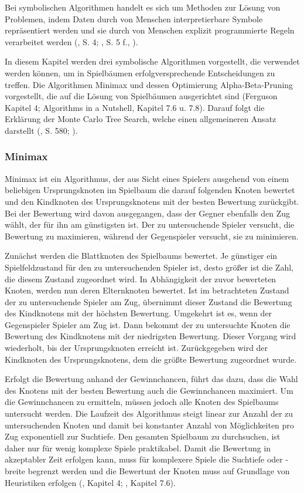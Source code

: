 \label{symbolische-algorithmen}

Bei symbolischen Algorithmen handelt es sich um Methoden zur Lösung von Problemen, indem Daten durch von Menschen interpretierbare Symbole repräsentiert werden und sie durch von Menschen explizit programmierte Regeln verarbeitet werden (\cite{Fergus.2022}, S. 4; \cite{Früh.2022}, S. 5 f., \cite{Garnelo.2019}).

In diesem Kapitel werden drei symbolische Algorithmen vorgestellt, die verwendet werden können, um in Spielbäumen erfolgversprechende Entscheidungen zu treffen. Die Algorithmen Minimax und dessen Optimierung Alpha-Beta-Pruning vorgestellt, die auf die Lösung von Spielbäumen ausgerichtet sind (Ferguson Kapitel 4; Algorithms in a Nutshell, Kapitel 7.6 u. 7.8). Darauf folgt die Erklärung der Monte Carlo Tree Search, welche einen allgemeineren Ansatz darstellt (\cite{Russell.2020}, S. 580; \cite{Swiechowski.2021}).

\subsubsection{Minimax}

Minimax ist ein Algorithmus, der aus Sicht eines Spielers ausgehend von einem beliebigen Ursprungsknoten im Spielbaum die darauf folgenden Knoten bewertet und den Kindknoten des Ursprungsknotens mit der besten Bewertung zurückgibt. Bei der Bewertung wird davon ausgegangen, dass der Gegner ebenfalls den Zug wählt, der für ihn am günstigsten ist. Der zu untersuchende Spieler versucht, die Bewertung zu maximieren, während der Gegenspieler versucht, sie zu minimieren.

Zunächst werden die Blattknoten des Spielbaums bewertet. Je günstiger ein Spielfeldzustand für den zu untersuchenden Spieler ist, desto größer ist die Zahl, die diesem Zustand zugeordnet wird. In Abhängigkeit der zuvor bewerteten Knoten, werden nun deren Elternknoten bewertet. Ist im betrachteten Zustand der zu untersuchende Spieler am Zug, übernimmt dieser Zustand die Bewertung des Kindknotens mit der höchsten Bewertung. Umgekehrt ist es, wenn der Gegenspieler Spieler am Zug ist. Dann bekommt der zu untersuchte Knoten die Bewertung des Kindknotens mit der niedrigsten Bewertung. Dieser Vorgang wird wiederholt, bis der Ursprungsknoten erreicht ist. Zurückgegeben wird der Kindknoten des Ursprungsknotens, dem die größte Bewertung zugeordnet wurde.

Erfolgt die Bewertung anhand der Gewinnchancen, führt das dazu, dass die Wahl des Knotens mit der besten Bewertung auch die Gewinnchancen maximiert. Um die Gewinnchancen zu ermitteln, müssen jedoch alle Knoten des Spielbaums untersucht werden. Die Laufzeit des Algorithmus steigt linear zur Anzahl der zu untersuchenden Knoten und damit bei konstanter Anzahl von Möglichkeiten pro Zug exponentiell zur Suchtiefe. Den gesamten Spielbaum zu durchsuchen, ist daher nur für wenig komplexe Spiele praktikabel. Damit die Bewertung in akzeptabler Zeit erfolgen kann, muss für komplexere Spiele die Suchtiefe oder -breite begrenzt werden und die Bewertunt der Knoten muss auf Grundlage von Heuristiken erfolgen (\cite{Ferguson.January2019}, Kapitel 4; \cite{Heineman.October2008}, Kapitel 7.6).

